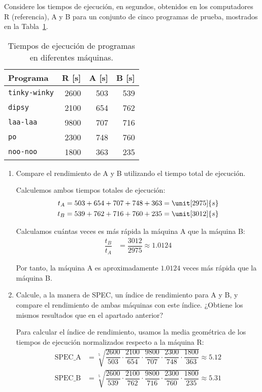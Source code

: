 \begin{ejercicio}\label{ej:4.6}
Considere los tiempos de ejecución, en segundos, obtenidos en los computadores R (referencia), A y B para un conjunto de cinco programas de prueba, mostrados en la Tabla~\ref{tab:ej:4.6}.
\begin{table}[h]
\centering
\begin{tabular}{@{}lrrr@{}}
\toprule
Programa & R [s] & A [s] & B [s] \\ \midrule
\verb|tinky-winky| & 2600 & 503 & 539 \\
\verb|dipsy| & 2100 & 654 & 762 \\
\verb|laa-laa| & 9800 & 707 & 716 \\
\verb|po| & 2300 & 748 & 760 \\
\verb|noo-noo| & 1800 & 363 & 235 \\ \bottomrule
\end{tabular}
\caption{Tiempos de ejecución de programas en diferentes máquinas.}
\label{tab:ej:4.6}
\end{table}
\begin{enumerate}
    \item Compare el rendimiento de A y B utilizando el tiempo total de ejecución.
    
    Calculemos ambos tiempos totales de ejecución:
    \begin{align*}
        t_{A} &= 503 + 654 + 707 + 748 + 363 = \unit[2975]{s}\\
        t_{B} &= 539 + 762 + 716 + 760 + 235 = \unit[3012]{s}
    \end{align*}

    Calculamos cuántas veces es más rápida la máquina A que la máquina B:
    \begin{align*}
        \dfrac{t_{B}}{t_{A}} &= \dfrac{3012}{2975} \approx 1.0124
    \end{align*}

    Por tanto, la máquina A es aproximadamente $1.0124$ veces más rápida que la máquina B.
        

    \item Calcule, a la manera de SPEC, un índice de rendimiento para A y B, y compare el rendimiento de ambas máquinas con este índice. ¿Obtiene los mismos resultados que en el apartado anterior?
    
    Para calcular el índice de rendimiento, usamos la media geométrica de los tiempos de ejecución normalizados respecto a la máquina R:
    \begin{align*}
        \text{SPEC\_A} &= \sqrt[5]{\dfrac{2600}{503} \cdot \dfrac{2100}{654} \cdot \dfrac{9800}{707} \cdot \dfrac{2300}{748} \cdot \dfrac{1800}{363}} \approx 5.12\\
        \text{SPEC\_B} &= \sqrt[5]{\dfrac{2600}{539} \cdot \dfrac{2100}{762} \cdot \dfrac{9800}{716} \cdot \dfrac{2300}{760} \cdot \dfrac{1800}{235}} \approx 5.31
    \end{align*}


\end{enumerate}
\end{ejercicio}
